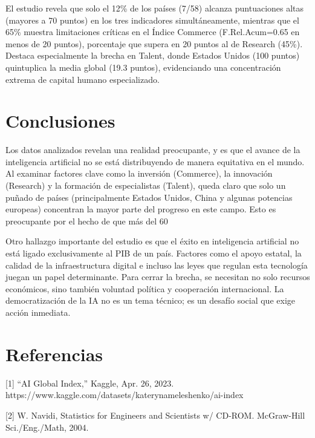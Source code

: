 \documentclass[
]{article}
\begin{document}
\begin{multicols}{2}
El estudio revela que solo el 12\% de los países (7/58) alcanza puntuaciones altas (mayores a 70 puntos) en los tres indicadores simultáneamente, mientras que el 65\% muestra limitaciones críticas en el Índice Commerce (F.Rel.Acum=0.65 en menos de 20 puntos), porcentaje que supera en 20 puntos al de Research (45\%). Destaca especialmente la brecha en Talent, donde Estados Unidos (100 puntos) quintuplica la media global (19.3 puntos), evidenciando una concentración extrema de capital humano especializado.

\section{Conclusiones}

Los datos analizados revelan una realidad preocupante, y es que el avance de la inteligencia artificial no se está distribuyendo de manera equitativa en el mundo. Al examinar factores clave como la inversión (Commerce), la innovación (Research) y la formación de especialistas (Talent), queda claro que solo un puñado de países (principalmente Estados Unidos, China y algunas potencias europeas) concentran la mayor parte del progreso en este campo. Esto es preocupante por el hecho de que más del 60%

Otro hallazgo importante del estudio es que el éxito en inteligencia artificial no está ligado exclusivamente al PIB de un país. Factores como el apoyo estatal, la calidad de la infraestructura digital e incluso las leyes que regulan esta tecnología juegan un papel determinante. Para cerrar la brecha, se necesitan no solo recursos económicos, sino también voluntad política y cooperación internacional. La democratización de la IA no es un tema técnico; es un desafío social que exige acción inmediata.

\section{Referencias}
[1]   “AI Global Index,” Kaggle, Apr. 26, 2023.         https://www.kaggle.com/datasets/katerynameleshenko/ai-index

[2]   W. Navidi, Statistics for Engineers and Scientists w/ CD-ROM. McGraw-Hill Sci./Eng./Math, 2004.

\end{multicols}
\end{document}
